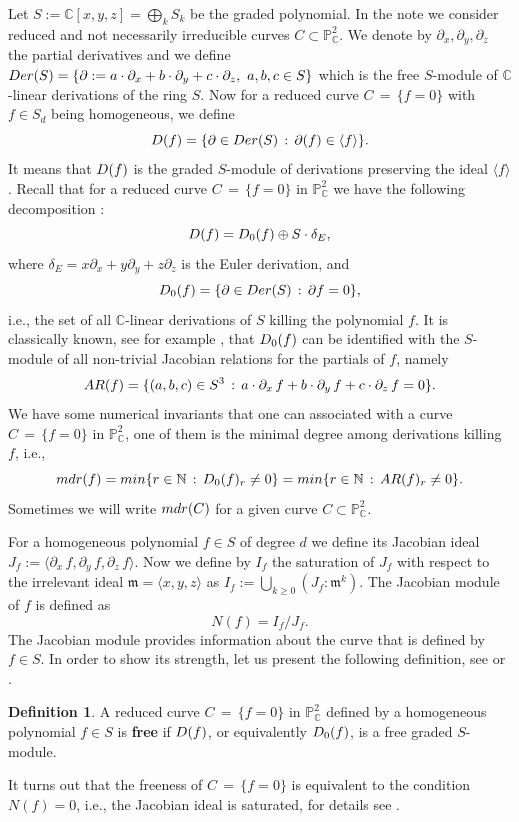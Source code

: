 \documentclass[12pt]{article}
\theoremstyle{plain}
\theoremstyle{definition}
\newtheorem{definition}[thm]{Definition}
\begin{document}
Let $S := \mathbb{C}[x,y,z] = \bigoplus_{k}S_{k}$ be the graded polynomial. In the note we consider reduced and not necessarily irreducible curves $C \subset \mathbb{P}^{2}_{\mathbb{C}}$. We denote by $\partial_{x}, \partial_{y}, \partial_{z}$ the partial derivatives and we define ${\rm Der}(S) = \{ \partial := a\cdot \partial_{x} + b\cdot \partial_{y} + c\cdot \partial_{z}, \,\, a,b,c \in S\}$ which is the free $S$-module of $\mathbb{C}$-linear derivations of the ring $S$. Now for a reduced curve $C \, = \, \{ f=0 \}$ with  $f \in S_{d}$ being homogeneous, we define
$${\rm D}(f) = \{ \partial \in {\rm Der}(S) \, : \, \partial (f) \in \langle f \rangle \}.$$
It means that ${\rm D}(f)$ is the graded $S$-module of derivations preserving the ideal $\langle f \rangle$. Recall that for a reduced curve $C \, = \, \{ f=0 \}$ in $\mathbb{P}^{2}_{\mathbb{C}}$ we have the following decomposition \cite[pp. 151-152]{Dimca}:
$${\rm D}(f) = {\rm D}_{0}(f) \oplus S\cdot \delta_{E},$$
where $\delta_{E} = x\partial_{x} + y\partial_{y} + z\partial_{z}$ is the Euler derivation, and 
$${\rm D}_{0}(f) = \{ \partial \in {\rm Der}(S) \, : \, \partial f = 0\},$$
i.e., the set of all $\mathbb{C}$-linear derivations of $S$ killing the polynomial $f$. It is classically known, see for example \cite[p. 151]{Dimca}, that ${\rm D}_{0}(f)$ can be identified with the $S$-module of all non-trivial Jacobian relations for the partials of $f$, namely
$${\rm AR}(f) = \{ (a,b,c)\in S^{3} \, : \, a\cdot \partial_{x}\, f + b\cdot \partial_{y} \, f + c\cdot \partial_{z} \, f =0 \}.$$
We have some numerical invariants that one can associated with a curve $C \, = \, \{ f=0 \}$ in $\mathbb{P}^{2}_{\mathbb{C}}$, one of them is the minimal degree among derivations killing $f$, i.e., 
$${\rm mdr}(f) = {\rm min}\{r \in \mathbb{N} \, : \, {\rm D}_{0}(f)_{r} \neq 0 \} = {\rm min}\{r \in \mathbb{N} \, : \, {\rm AR}(f)_{r}\neq 0\}.$$
Sometimes we will write ${\rm mdr}(C)$ for a given curve $C \subset \mathbb{P}^{2}_{\mathbb{C}}$.

For a homogeneous polynomial $f \in S$ of degree $d$ we define its Jacobian ideal $J_{f} :=\langle \partial_{x}\, f , \partial_{y}\, f, \partial_{z}\, f \rangle$. Now we define by $I_{f}$ the saturation of $J_{f}$ with respect to the irrelevant ideal $\mathfrak{m} = \langle x,y,z \rangle$ as $I_{f} := \bigcup_{k \geq 0}(J_{f} : \mathfrak{m}^{k})$. The Jacobian module of $f$ is defined as
$$N(f) = I_{f} / J_{f}.$$
The Jacobian module provides information about the curve that is defined by $f \in S$. In order to show its strength, let us present the following definition, see \cite[Definition 8.1]{Dimca} or \cite[Remark 4.7]{DimcaSernesi}.
\begin{definition}
A reduced curve $C \, = \, \{ f=0 \}$ in $\mathbb{P}^{2}_{\mathbb{C}}$ defined by a homogeneous polynomial $f \in S$ is \textbf{free} if ${\rm D}(f)$, or equivalently ${\rm D}_{0}(f)$, is a free graded $S$-module. 
\end{definition}
\noindent
It turns out that the freeness of $C \, = \, \{ f=0 \}$ is equivalent to the condition $N(f)=0$, i.e., the Jacobian ideal is saturated, for details see \cite[Proposition 1.9]{ST}. 
\end{document}
